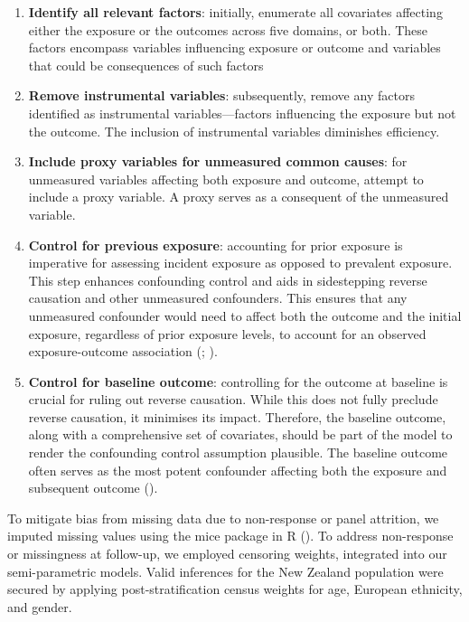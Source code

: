 \documentclass[
  singlecolumn]{article}
\begin{document}
\begin{enumerate}
\def\labelenumi{\arabic{enumi}.}
\item
  \textbf{Identify all relevant factors}: initially, enumerate all
  covariates affecting either the exposure or the outcomes across five
  domains, or both. These factors encompass variables influencing
  exposure or outcome and variables that could be consequences of such
  factors
\item
  \textbf{Remove instrumental variables}: subsequently, remove any
  factors identified as instrumental variables---factors influencing the
  exposure but not the outcome. The inclusion of instrumental variables
  diminishes efficiency.
\item
  \textbf{Include proxy variables for unmeasured common causes}: for
  unmeasured variables affecting both exposure and outcome, attempt to
  include a proxy variable. A proxy serves as a consequent of the
  unmeasured variable.
\item
  \textbf{Control for previous exposure}: accounting for prior exposure
  is imperative for assessing incident exposure as opposed to prevalent
  exposure. This step enhances confounding control and aids in
  sidestepping reverse causation and other unmeasured confounders. This
  ensures that any unmeasured confounder would need to affect both the
  outcome and the initial exposure, regardless of prior exposure levels,
  to account for an observed exposure-outcome association
  (;
  ).
\item
  \textbf{Control for baseline outcome}: controlling for the outcome at
  baseline is crucial for ruling out reverse causation. While this does
  not fully preclude reverse causation, it minimises its impact.
  Therefore, the baseline outcome, along with a comprehensive set of
  covariates, should be part of the model to render the confounding
  control assumption plausible. The baseline outcome often serves as the
  most potent confounder affecting both the exposure and subsequent
  outcome ().
\end{enumerate}

To mitigate bias from missing data due to non-response or panel
attrition, we imputed missing values using the mice package in R
(). To address non-response
or missingness at follow-up, we employed censoring weights, integrated
into our semi-parametric models. Valid inferences for the New Zealand
population were secured by applying post-stratification census weights
for age, European ethnicity, and gender.
\end{document}
